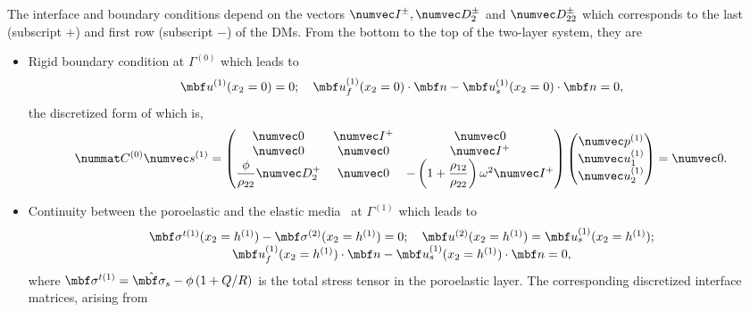 The interface and boundary conditions depend on the vectors $\numvec I^\pm, \numvec D_{2}^\pm$ and $\numvec D_{22}^\pm$ which corresponds to the last (subscript $+$) and first row (subscript $-$) of the DMs. From the bottom to the top of the two-layer system, they are
        \begin{itemize}
        \item Rigid boundary condition at $\Gamma^{(0)}$ which leads to
        \begin{equation}
            \mbf u^{(1)}(x_2=0) = 0; \quad 
            \mbf u_f^{(1)}(x_2=0) \cdot \mbf n - \mbf u_s^{(1)}(x_2=0) \cdot \mbf n = 0,
            \label{eq1}
    \end{equation}
the discretized form of which is,
    \begin{equation} \nummat C^{(0)} \numvec s^{(1)} = 
        \begin{pmatrix}
            \numvec 0 & \numvec I^+ & \numvec 0 \\
            \numvec 0 & \numvec 0 & \numvec I^+ \\
           \displaystyle \frac{\phi}{ \rho_{22} } \numvec D_{2}^+ & \numvec 0 & - \left( 1 +\displaystyle\frac{ \rho_{12}} { \rho_{22}} \right) \omega^2\numvec I^+
        \end{pmatrix} \begin{pmatrix}
            \numvec p^{(1)} \\ \numvec u^{(1)}_{1} \\ \numvec u^{(1)}_{2}
        \end{pmatrix} = \numvec 0.
        \label{eq:rigid_poro_cont_matrix}
    \end{equation}
    \item Continuity between the poroelastic and the elastic media~\cite{debergue1999} at $\Gamma^{(1)}$ which leads to
    \begin{equation}
    \begin{array}{c}
          \mbf \sigma^{t(1)}(x_2=h^{(1)})-\mbf \sigma^{(2)}(x_2=h^{(1)})=0; \quad 
        \mbf u^{(2)}(x_2=h^{(1)}) = \mbf u_s^{(1)}(x_2=h^{(1)}); \\
        \mbf u_f^{(1)}(x_2=h^{(1)}) \cdot \mbf n - \mbf u_s^{(1)}(x_2=h^{(1)}) \cdot \mbf n = 0,
        \end{array}
    \end{equation}
   where $\mbf \sigma^{t(1)} = \hat{\mbf \sigma_s} - \phi \left( 1 + Q/R\right)$ is the total stress tensor in the poroelastic layer. The corresponding discretized interface matrices, arising from 

\end{itemize}
